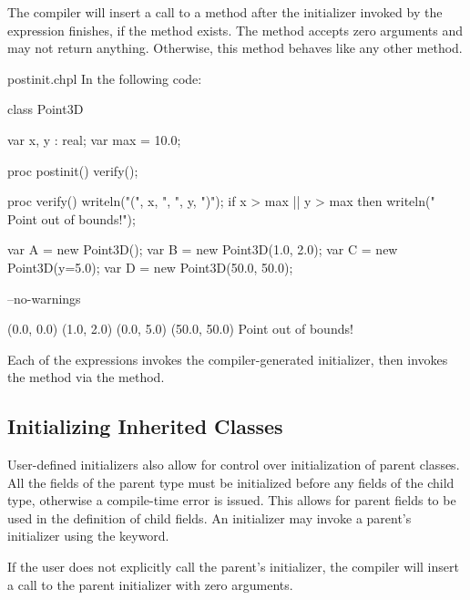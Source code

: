 The compiler will insert a call to a  method after the
initializer invoked by the  expression finishes, if the method
exists. The  method accepts zero arguments and may not return
anything. Otherwise, this method behaves like any other method.

\begin{chapelexample}{postinit.chpl}
In the following code:
\begin{chapel}
class Point3D {
  var x, y : real;
  var max = 10.0;

  proc postinit() {
    verify();
  }

  proc verify() {
    writeln("(", x, ", ", y, ")");
    if x > max || y > max then
      writeln("  Point out of bounds!");
  }
}

var A = new Point3D();
var B = new Point3D(1.0, 2.0);
var C = new Point3D(y=5.0);
var D = new Point3D(50.0, 50.0);
\end{chapel}
\begin{chapelcompopts}
--no-warnings
\end{chapelcompopts}
\begin{chapelprintoutput}
(0.0, 0.0)
(1.0, 2.0)
(0.0, 5.0)
(50.0, 50.0)
  Point out of bounds!
\end{chapelprintoutput}
Each of the  expressions invokes the compiler-generated initializer,
then invokes the  method via the  method.
\end{chapelexample}

\subsection{Initializing Inherited Classes}
\label{Initializing_Inherited}

User-defined initializers also allow for control over initialization of parent
classes. All the fields of the parent type must be initialized before any
fields of the child type, otherwise a compile-time error is issued. This allows
for parent fields to be used in the definition of child fields. An initializer
may invoke a parent's initializer using the  keyword.

If the user does not explicitly call the parent's initializer, the compiler
will insert a call to the parent initializer with zero arguments.

